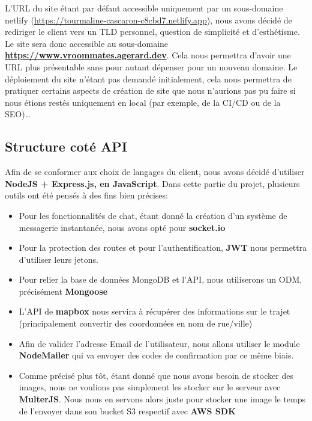 L'URL du site étant par défaut accessible uniquement par un sous-domaine netlify (\href{https://tourmaline-cascaron-c8cbd7.netlify.app}{https://tourmaline-cascaron-c8cbd7.netlify.app}), nous avons décidé de rediriger le client vers un TLD personnel, question de simplicité et d'esthétisme. Le site sera donc accessible au sous-domaine \textbf{\href{https://www.vroommates.agerard.dev}{https://www.vroommates.agerard.dev}}. Cela nous permettra d'avoir une URL plus présentable sans pour autant dépenser pour un nouveau domaine. Le déploiement du site n'étant pas demandé initialement, cela nous permettra de pratiquer certains aspects de création de site que nous n'aurions pas pu faire si nous étions restés uniquement en local (par exemple, de la CI/CD ou de la SEO)…

\subsection{Structure coté API}

Afin de se conformer aux choix de langages du client, nous avons décidé d'utiliser \textbf{NodeJS + Express.js, en JavaScript}.
Dans cette partie du projet, plusieurs outils ont été pensés à des fins bien précises:
\begin{itemize}
\item Pour les fonctionnalités de chat, étant donné la création d'un système de messagerie instantanée, nous avons opté pour \textbf{socket.io}
\item Pour la protection des routes et pour l'authentification, \textbf{JWT} nous permettra d'utiliser leurs jetons.
\item Pour relier la base de données MongoDB et l'API, nous utiliserons un ODM, précisément \textbf{Mongoose}
\item L'API de \textbf{mapbox} nous servira à récupérer des informations sur le trajet (principalement convertir des coordonnées en nom de rue/ville)
\item Afin de valider l'adresse Email de l'utilisateur, nous allons utiliser le module \textbf{NodeMailer} qui va envoyer des codes de confirmation par ce même biais.
\item Comme précisé plus tôt, étant donné que nous avons besoin de stocker des images, nous ne voulions pas simplement les stocker sur le serveur avec \textbf{MulterJS}. Nous nous en servons alors juste pour stocker une image le temps de l'envoyer dans son bucket S3 respectif avec \textbf{AWS SDK}
\end{itemize}


